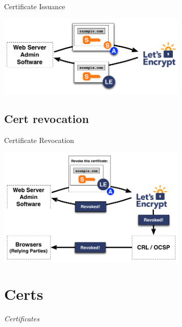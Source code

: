\documentclass[xcolor=svgnames,11pt]{beamer}
\begin{document}
\begin{frame}{Certificate Issuance}
\begin{center}
\includegraphics[width=9cm]{img/proto_3.png}
\end{center}
\end{frame}

\subsection{Cert revocation}
\begin{frame}{Certificate Revocation}
\begin{center}
\includegraphics[width=9cm]{img/proto_4.png}
\end{center}
\end{frame}

\section{Certs}
\begin{frame}{}
\begin{center}
\begin{Huge}
\textcolor{leorange}{\emph{Certificates}}
\end{Huge}
\end{center}
\end{frame}
\end{document}
